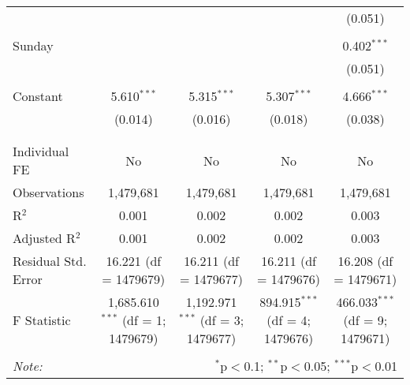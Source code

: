 \documentclass[
]{article}
\begin{document}
\begin{table}[!htbp]
{\begin{tabular}{@{\extracolsep{5pt}}lcccc}
  &  &  &  & (0.051) \\ 
  & & & & \\ 
 Sunday &  &  &  & 0.402$^{***}$ \\ 
  &  &  &  & (0.051) \\ 
  & & & & \\ 
 Constant & 5.610$^{***}$ & 5.315$^{***}$ & 5.307$^{***}$ & 4.666$^{***}$ \\ 
  & (0.014) & (0.016) & (0.018) & (0.038) \\ 
  & & & & \\ 
\hline \\[-1.8ex] 
Individual FE & No & No & No & No \\ 
Observations & 1,479,681 & 1,479,681 & 1,479,681 & 1,479,681 \\ 
R$^{2}$ & 0.001 & 0.002 & 0.002 & 0.003 \\ 
Adjusted R$^{2}$ & 0.001 & 0.002 & 0.002 & 0.003 \\ 
Residual Std. Error & 16.221 (df = 1479679) & 16.211 (df = 1479677) & 16.211 (df = 1479676) & 16.208 (df = 1479671) \\ 
F Statistic & 1,685.610$^{***}$ (df = 1; 1479679) & 1,192.971$^{***}$ (df = 3; 1479677) & 894.915$^{***}$ (df = 4; 1479676) & 466.033$^{***}$ (df = 9; 1479671) \\ 
\hline 
\hline \\[-1.8ex] 
\textit{Note:}  & \multicolumn{4}{r}{$^{*}$p$<$0.1; $^{**}$p$<$0.05; $^{***}$p$<$0.01} \\ 
\end{tabular}
} 
\end{table} 
\newpage
\end{document}
